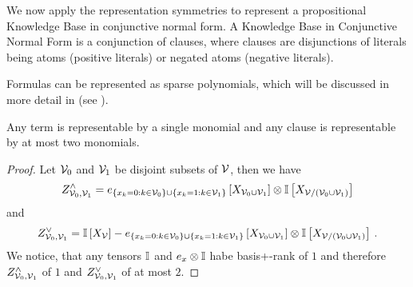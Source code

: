 



We now apply the representation symmetries to represent a propositional Knowledge Base in conjunctive normal form.
A Knowledge Base in Conjunctive Normal Form is a conjunction of clauses, where clauses are disjunctions of literals being atoms (positive literals) or negated atoms (negative literals).

Formulas can be represented as sparse polynomials, which will be discussed in more detail in  (see ).

\begin{lemma}\label{lem:clauseTermBasisPlus}
	Any term is representable by a single monomial and any clause is representable by at most two monomials. %
\end{lemma}
\begin{proof}
	Let $\mathcal{V}_0$ and $\mathcal{V}_1$ be disjoint subsets of $\mathcal{V}$, then we have
	\begin{align*}
		Z^{\land}_{\mathcal{V}_0,\mathcal{V}_1} = e_{
			\{x_{k} = 0 : k\in\mathcal{V}_0\} \cup \{x_{k} = 1 : k\in\mathcal{V}_1\}
		}\left[X_{\mathcal{V}_0\cup\mathcal{V}_1}\right] \otimes \mathbb{I}\left[X_{\mathcal{V}/(\mathcal{V}_0\cup\mathcal{V}_1)}\right]
	\end{align*}
	and
	\begin{align*}
		Z^{\lor}_{\mathcal{V}_0,\mathcal{V}_1} = \mathbb{I}\left[X_{\mathcal{V}}\right] - e_{
			\{x_{k} = 0 : k\in\mathcal{V}_0\} \cup \{x_{k} = 1 : k\in\mathcal{V}_1\}
		}\left[X_{\mathcal{V}_0\cup\mathcal{V}_1}\right]
		\otimes \mathbb{I}\left[X_{\mathcal{V}/(\mathcal{V}_0\cup\mathcal{V}_1)}\right] \, . 
	\end{align*}
	We notice, that any tensors $\mathbb{I}$ and $e_{x}\otimes \mathbb{I}$ habe basis+-rank of $1$ and therefore $Z^{\land}_{\mathcal{V}_0,\mathcal{V}_1}$ of $1$ and $Z^{\lor}_{\mathcal{V}_0,\mathcal{V}_1}$ of at most $2$.
\end{proof}


